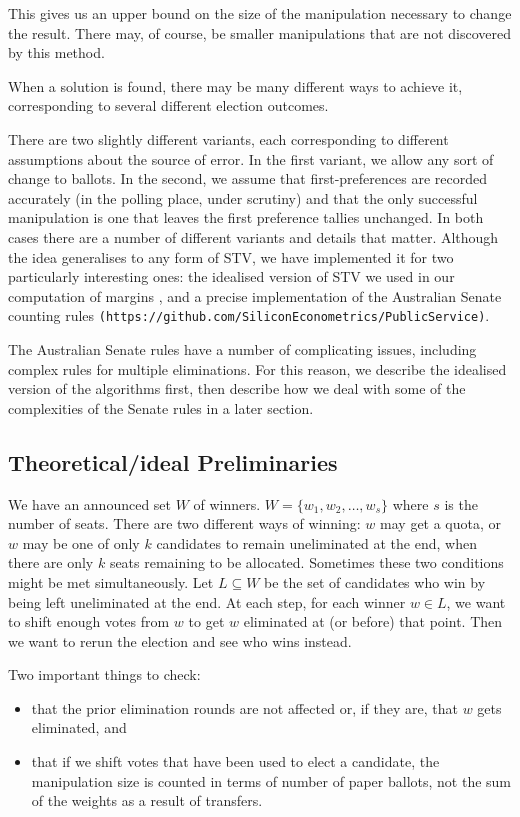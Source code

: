\documentclass[10pt,a4paper]{article}
\begin{document}
This gives us an upper bound on the size of the manipulation necessary to change the result.  There may, of course, be smaller manipulations that are not discovered by this method.  

When a solution is found, there may be many different ways to achieve it, corresponding to several different election outcomes.  

There are two slightly different variants, each corresponding to different assumptions about the source of error.  In the first variant, we allow any sort of change to ballots.  In the second, we assume that first-preferences are recorded accurately (in the polling place, under scrutiny) and that the only successful manipulation is one that leaves the first preference tallies unchanged.  In both cases there are a number of different variants and details that matter.  Although the idea generalises to any form of STV, we have implemented it for two particularly interesting ones: the idealised version of STV we used in our computation of margins \cite{blom2015efficient}, and a precise implementation of the Australian Senate counting rules \verb|(https://github.com/SiliconEconometrics/PublicService)|.

The Australian Senate rules have a number of complicating issues, including complex rules for multiple eliminations.  For this reason, we describe the idealised version of the algorithms first, then describe how we deal with some of the complexities of the Senate rules in a later section.

\subsection{Theoretical/ideal Preliminaries}
We have an announced set $W$ of winners.  $W = \{w_1, w_2, \ldots, w_s \}$ where $s$ is the number of seats.  There are two different ways of winning: $w$ may get a quota, or $w$ may be one of only $k$ candidates to remain uneliminated at the end, when there are only $k$ seats remaining to be allocated.  Sometimes these two conditions might be met simultaneously.  Let $L \subseteq W$ be the set of candidates who win by being left uneliminated at the end.  At each step, for each winner $w \in L$, we want to shift enough votes from $w$ to get $w$ eliminated at (or before) that point.  Then we want to rerun the election and see who wins instead.

Two important things to check:
\begin{itemize}
	\item that the prior elimination rounds are not affected or, if they are, that $w$ gets eliminated, and
	\item that if we shift votes that have been used to elect a candidate, the manipulation size is counted in terms of number of paper ballots, not the sum of the weights as a result of transfers.
\end{itemize}
\end{document}
